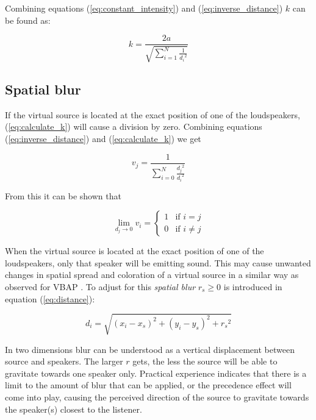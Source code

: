 \documentclass[twoside,10pt]{article}
\begin{document}
Combining equations (\ref{eq:constant_intensity}) and (\ref{eq:inverse_distance}) $k$ can be found as:

\begin{equation} \label{eq:calculate_k}
k = \frac{2a}{\sqrt{\sum_{i=1}^{N} \frac{1}{{d_{i}}^2}}}
\end{equation}




\subsection{Spatial blur}

If the virtual source is located at the exact position of one of the loudspeakers, (\ref{eq:calculate_k}) will cause a division by zero. Combining equations (\ref{eq:inverse_distance}) and (\ref{eq:calculate_k}) we get

\begin{equation}
v_{j} = \frac{1}{\sum_{i=0}^{N} \frac{{d_{j}}^2}{{d_{i}}^2}}
\end{equation}

From this it can be shown that

\begin{equation} \label{eq:distance_zero}
\lim_{d_{j} \rightarrow 0} v_{i} = 
\left\{ \begin{array}{ll} 
1 & \textrm{if $i=j$}\\ 
0 & \textrm{if $i \ne j$}
\end{array} \right.
\end{equation}

When the virtual source is located at the exact position of one of the loudspeakers, only that speaker will be emitting sound. This may cause unwanted changes in spatial spread and coloration of a virtual source in a similar way as observed for VBAP \cite{Pulkki:1999vbap}. To adjust for this \textit{spatial blur} $r_{s} \ge 0$ is introduced in equation (\ref{eq:distance}):

\begin{equation} \label{eq:mod_distance}
d_{i} = \sqrt{ {(x_{i} - x_{s})}^2 + {(y_{i} - y_{s})}^2 + {r_{s}}^2}
\end{equation}

In two dimensions blur can be understood as a vertical displacement between source and speakers. The larger $r$ gets, the less the source will be able to gravitate towards one speaker only. Practical experience indicates that there is a limit to the amount of blur that can be applied, or the precedence effect \cite{Litovsky:1999precedence_effect} will come into play, causing the perceived direction of the source to gravitate towards the speaker(s) closest to the listener.
\end{document}
